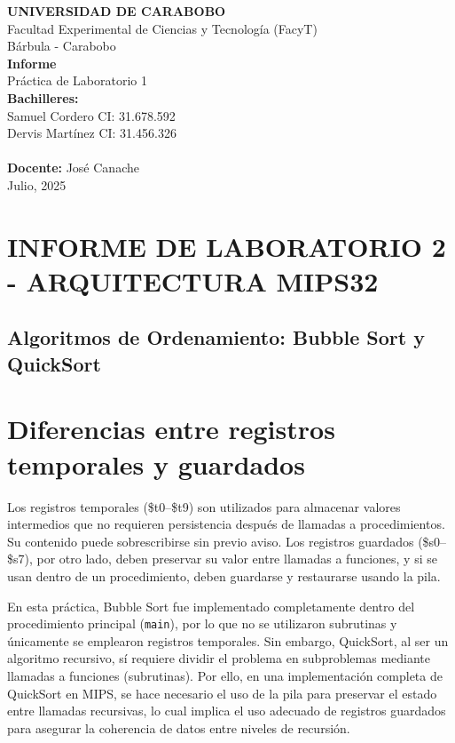 \documentclass[12pt]{article}
\begin{document}
\begin{titlepage}
    \begin{center}
        \large{\textbf{UNIVERSIDAD DE CARABOBO}} \\
        \large{Facultad Experimental de Ciencias y Tecnología (FacyT)} \\
        \large{Bárbula - Carabobo} \\
        \vfill
        \Huge{\textbf{Informe}} \\
        \huge{Práctica de Laboratorio 1} \\
        \vfill
        \textbf{Bachilleres:} \\
        Samuel Cordero \hfill CI: 31.678.592 \\
        Dervis Martínez \hfill CI: 31.456.326 \\
        \vspace{1cm} \\
        \textbf{Docente:} José Canache \\
        \vfill
        \large{Julio, 2025}
    \end{center}
\end{titlepage}

\section*{INFORME DE LABORATORIO 2 - ARQUITECTURA MIPS32}
\subsection*{Algoritmos de Ordenamiento: Bubble Sort y QuickSort}

\section{Diferencias entre registros temporales y guardados}
Los registros temporales (\$t0--\$t9) son utilizados para almacenar valores intermedios que no requieren persistencia después de llamadas a procedimientos. Su contenido puede sobrescribirse sin previo aviso. Los registros guardados (\$s0--\$s7), por otro lado, deben preservar su valor entre llamadas a funciones, y si se usan dentro de un procedimiento, deben guardarse y restaurarse usando la pila.

En esta práctica, Bubble Sort fue implementado completamente dentro del procedimiento principal (\texttt{main}), por lo que no se utilizaron subrutinas y únicamente se emplearon registros temporales. Sin embargo, QuickSort, al ser un algoritmo recursivo, sí requiere dividir el problema en subproblemas mediante llamadas a funciones (subrutinas). Por ello, en una implementación completa de QuickSort en MIPS, se hace necesario el uso de la pila para preservar el estado entre llamadas recursivas, lo cual implica el uso adecuado de registros guardados para asegurar la coherencia de datos entre niveles de recursión.
\end{document}

